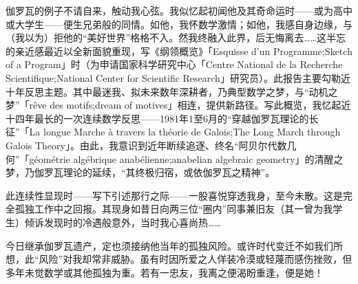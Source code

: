 伽罗瓦的例子不请自来，触动我心弦。我似忆起初闻他及其奇命运时——或为高中或大学生——便生兄弟般的同情。如他，我怀数学激情；如他，我感自身边缘，与（我以为）拒他的“美好世界”格格不入。然我终融入此界，后无悔离去……这半忘的亲近感最近以全新面貌重现，写《纲领概览》「Esquisse d'un Programme;Sketch of a Program」时（为申请国家科学研究中心「Centre National de la Recherche Scientifique;National Center for Scientific Research」研究员）。此报告主要勾勒近十年反思主题。其中最迷我、拟未来数年深耕者，乃典型数学之梦，与“动机之梦”「rêve des motifs;dream of motives」相连，提供新路径。写此概览，我忆起近十四年最长的一次连续数学反思——1981年1至6月的“穿越伽罗瓦理论的长征”「La longue Marche à travers la théorie de Galois;The Long March through Galois Theory」。由此，我意识到近年断续追逐、终名“阿贝尔代数几何”「géométrie algébrique anabélienne;anabelian algebraic geometry」的清醒之梦，乃伽罗瓦理论的延续，“其终极归宿，或依伽罗瓦之精神”。

此连续性显现时——写下引述那行之际——一股喜悦穿透我身，至今未散。这是完全孤独工作中之回报。其现身如昔日向两三位“圈内”同事兼旧友（其一曾为我学生）倾诉发现时的冷遇般意外，当时我心喜尚热……

今日继承伽罗瓦遗产，定也须接纳他当年的孤独风险。或许时代变迁不如我们所想，此“风险”对我却常非威胁。虽有时因所爱之人佯装冷漠或轻蔑而感伤挫败，但多年未觉数学或其他孤独为重。若有一忠友，我离之便渴盼重逢，便是她！